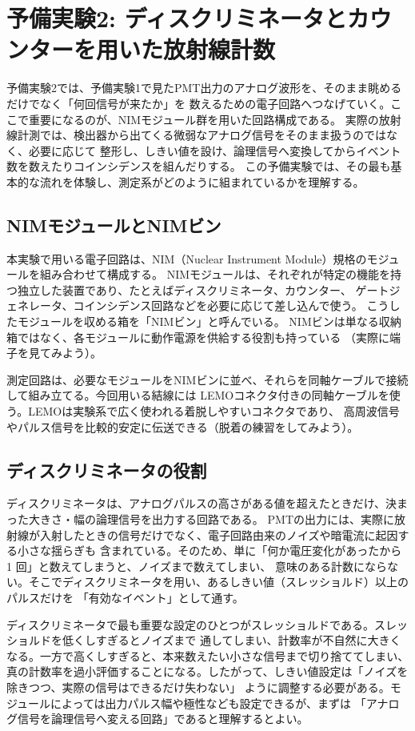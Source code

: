 \documentclass[uplatex,dvipdfmx,12pt,nomag]{jsarticle}
\begin{document}
\section{予備実験2: ディスクリミネータとカウンターを用いた放射線計数}

予備実験2では、予備実験1で見たPMT出力のアナログ波形を、そのまま眺めるだけでなく「何回信号が来たか」を
数えるための電子回路へつなげていく。ここで重要になるのが、NIMモジュール群を用いた回路構成である。
実際の放射線計測では、検出器から出てくる微弱なアナログ信号をそのまま扱うのではなく、必要に応じて
整形し、しきい値を設け、論理信号へ変換してからイベント数を数えたりコインシデンスを組んだりする。
この予備実験では、その最も基本的な流れを体験し、測定系がどのように組まれているかを理解する。

\subsection{NIMモジュールとNIMビン}

本実験で用いる電子回路は、NIM（Nuclear Instrument Module）規格のモジュールを組み合わせて構成する。
NIMモジュールは、それぞれが特定の機能を持つ独立した装置であり、たとえばディスクリミネータ、カウンター、
ゲートジェネレータ、コインシデンス回路などを必要に応じて差し込んで使う。
こうしたモジュールを収める箱を「NIMビン」と呼んでいる。
NIMビンは単なる収納箱ではなく、各モジュールに動作電源を供給する役割も持っている
（実際に端子を見てみよう）。

測定回路は、必要なモジュールをNIMビンに並べ、それらを同軸ケーブルで接続して組み立てる。今回用いる結線には
LEMOコネクタ付きの同軸ケーブルを使う。LEMOは実験系で広く使われる着脱しやすいコネクタであり、
高周波信号やパルス信号を比較的安定に伝送できる（脱着の練習をしてみよう）。

\subsection{ディスクリミネータの役割}

ディスクリミネータは、アナログパルスの高さがある値を超えたときだけ、決まった大きさ・幅の論理信号を出力する回路である。
PMTの出力には、実際に放射線が入射したときの信号だけでなく、電子回路由来のノイズや暗電流に起因する小さな揺らぎも
含まれている。そのため、単に「何か電圧変化があったから 1 回」と数えてしまうと、ノイズまで数えてしまい、
意味のある計数にならない。そこでディスクリミネータを用い、あるしきい値（スレッショルド）以上のパルスだけを
「有効なイベント」として通す。

ディスクリミネータで最も重要な設定のひとつがスレッショルドである。スレッショルドを低くしすぎるとノイズまで
通してしまい、計数率が不自然に大きくなる。一方で高くしすぎると、本来数えたい小さな信号まで切り捨ててしまい、
真の計数率を過小評価することになる。したがって、しきい値設定は「ノイズを除きつつ、実際の信号はできるだけ失わない」
ように調整する必要がある。モジュールによっては出力パルス幅や極性なども設定できるが、まずは
「アナログ信号を論理信号へ変える回路」であると理解するとよい。
\end{document}
